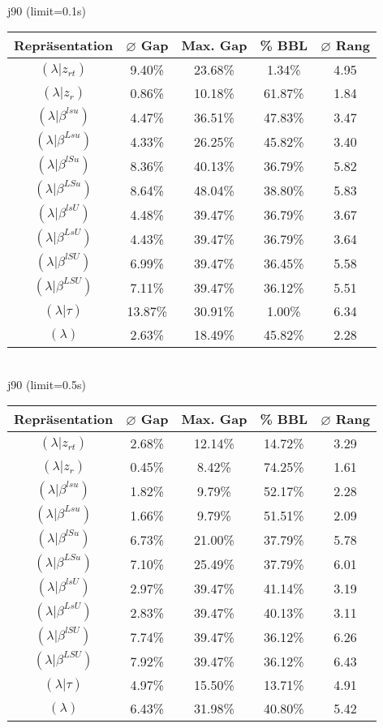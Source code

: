 \documentclass{scrartcl}
\begin{document}
\\[8pt]j90 (limit=0.1s)\\\begin{tabular}{ccccc}
\hline
Repräsentation & $\varnothing$ Gap & Max. Gap & \% BBL & $\varnothing$ Rang\\[3pt]
\hline
$(\lambda|z_{rt})$&9.40\%&23.68\%&1.34\%&4.95\\
\hline
$(\lambda|z_r)$&0.86\%&10.18\%&61.87\%&1.84\\
\hline
$(\lambda|\beta^{lsu})$&4.47\%&36.51\%&47.83\%&3.47\\
\hline
$(\lambda|\beta^{Lsu})$&4.33\%&26.25\%&45.82\%&3.40\\
\hline
$(\lambda|\beta^{lSu})$&8.36\%&40.13\%&36.79\%&5.82\\
\hline
$(\lambda|\beta^{LSu})$&8.64\%&48.04\%&38.80\%&5.83\\
\hline
$(\lambda|\beta^{lsU})$&4.48\%&39.47\%&36.79\%&3.67\\
\hline
$(\lambda|\beta^{LsU})$&4.43\%&39.47\%&36.79\%&3.64\\
\hline
$(\lambda|\beta^{lSU})$&6.99\%&39.47\%&36.45\%&5.58\\
\hline
$(\lambda|\beta^{LSU})$&7.11\%&39.47\%&36.12\%&5.51\\
\hline
$(\lambda|\tau)$&13.87\%&30.91\%&1.00\%&6.34\\
\hline
$(\lambda)$&2.63\%&18.49\%&45.82\%&2.28\\\hline
\end{tabular}
\\[8pt]j90 (limit=0.5s)\\\begin{tabular}{ccccc}
\hline
Repräsentation & $\varnothing$ Gap & Max. Gap & \% BBL & $\varnothing$ Rang\\[3pt]
\hline
$(\lambda|z_{rt})$&2.68\%&12.14\%&14.72\%&3.29\\
\hline
$(\lambda|z_r)$&0.45\%&8.42\%&74.25\%&1.61\\
\hline
$(\lambda|\beta^{lsu})$&1.82\%&9.79\%&52.17\%&2.28\\
\hline
$(\lambda|\beta^{Lsu})$&1.66\%&9.79\%&51.51\%&2.09\\
\hline
$(\lambda|\beta^{lSu})$&6.73\%&21.00\%&37.79\%&5.78\\
\hline
$(\lambda|\beta^{LSu})$&7.10\%&25.49\%&37.79\%&6.01\\
\hline
$(\lambda|\beta^{lsU})$&2.97\%&39.47\%&41.14\%&3.19\\
\hline
$(\lambda|\beta^{LsU})$&2.83\%&39.47\%&40.13\%&3.11\\
\hline
$(\lambda|\beta^{lSU})$&7.74\%&39.47\%&36.12\%&6.26\\
\hline
$(\lambda|\beta^{LSU})$&7.92\%&39.47\%&36.12\%&6.43\\
\hline
$(\lambda|\tau)$&4.97\%&15.50\%&13.71\%&4.91\\
\hline
$(\lambda)$&6.43\%&31.98\%&40.80\%&5.42\\\hline
\end{tabular}
\end{document}
